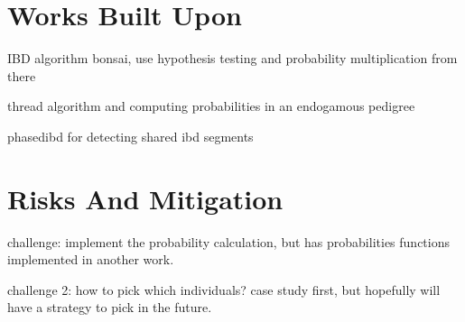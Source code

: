 \documentclass[12pt]{article}
\begin{document}
\section*{Works Built Upon}

IBD algorithm bonsai, use hypothesis testing and probability multiplication from there

thread algorithm and computing probabilities in an endogamous pedigree

phasedibd for detecting shared ibd segments

\section*{Risks And Mitigation}

challenge: implement the probability calculation, but has probabilities functions implemented in another work.

challenge 2: how to pick which individuals? case study first, but hopefully will have a strategy to pick in the future. 

\printbibliography
\end{document}
